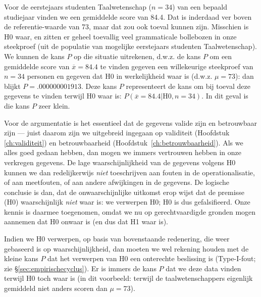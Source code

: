 \documentclass[
]{book}
\begin{document}
Voor de
eerstejaars studenten Taalwetenschap (\(n=34\)) van een bepaald studiejaar
vinden we een gemiddelde score van 84.4. Dat is inderdaad ver boven de
referentie-waarde van 73, maar dat zou ook toeval kunnen zijn. Misschien
is H0 waar, en zitten er geheel toevallig veel grammaticale bollebozen
in onze steekproef (uit de populatie van mogelijke eerstejaars studenten
Taalwetenschap). We kunnen de kans \(P\) op die situatie uitrekenen,
d.w.z. de kans \(P\) om een gemiddelde score van \(\overline{x}=84.4\) te
vinden gegeven een willekeurige steekproef van \(n=34\) personen en
gegeven dat H0 in werkelijkheid waar is (d.w.z. \(\mu=73\)): dan blijkt
\(P=.000000001913\). Deze kans \(P\) representeert de kans om bij toeval
deze gegevens te vinden terwijl H0 waar is:
\(P(\overline{x}=84.4|\textrm{H0},n=34)\). In dit geval is die kans \(P\)
zeer klein.

Voor de argumentatie is het essentieel dat de gegevens valide zijn en
betrouwbaar zijn --- juist daarom zijn we uitgebreid ingegaan op
validiteit
(Hoofdstuk \ref{ch:validiteit}) en betrouwbaarheid
(Hoofdstuk~\ref{ch:betrouwbaarheid}). Als we alles goed gedaan hebben, dan
mogen we immers vertrouwen hebben in onze verkregen gegevens. De lage
waarschijnlijkheid van de gegevens volgens H0 kunnen we dan
redelijkerwijs \emph{niet} toeschrijven aan fouten in de operationalisatie,
of aan meetfouten, of aan andere afwijkingen in de gegevens. De logische
conclusie is dan, dat de onwaarschijnlijke uitkomst erop wijst dat de
premisse (H0) waarschijnlijk \emph{niet} waar is: we verwerpen H0; H0 is dus
gefalsifieerd. Onze kennis is daarmee toegenomen, omdat we nu op
gerechtvaardigde gronden mogen aannemen dat H0 onwaar is (en dus dat H1
waar is).

Indien we H0 verwerpen, op basis van bovenstaande redenering, die weer
gebaseerd is op waarschijnlijkheid, dan moeten we wel rekening houden
met de kleine kans \(P\) dat het verwerpen van H0 een onterechte
beslissing is (Type-I-fout; zie
§\ref{sec:empirischecyclus}). Er is immers de kans \(P\) dat we deze
data vinden terwijl H0 toch waar is (in dit voorbeeld: terwijl de
taalwetenschappers eigenlijk gemiddeld niet anders scoren dan \(\mu=73\)).
\end{document}

